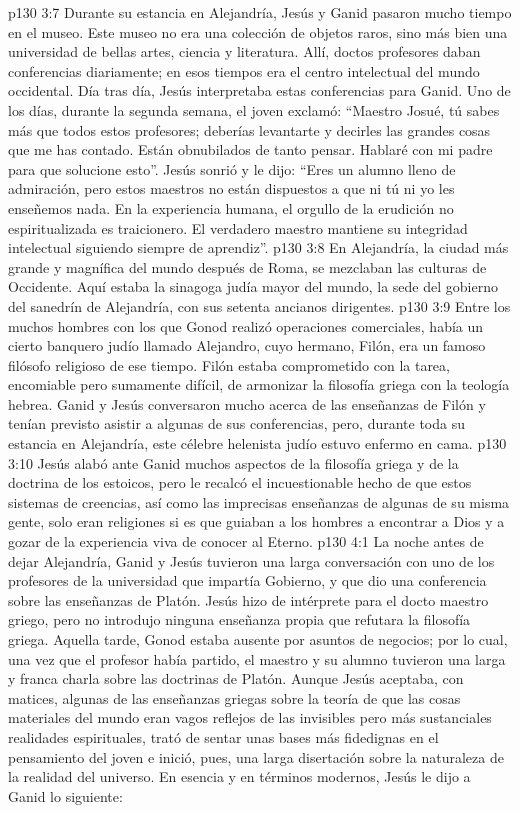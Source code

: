 \vs p130 3:7 \pc Durante su estancia en Alejandría, Jesús y Ganid pasaron mucho tiempo en el museo. Este museo no era una colección de objetos raros, sino más bien una universidad de bellas artes, ciencia y literatura. Allí, doctos profesores daban conferencias diariamente; en esos tiempos era el centro intelectual del mundo occidental. Día tras día, Jesús interpretaba estas conferencias para Ganid. Uno de los días, durante la segunda semana, el joven exclamó: “Maestro Josué, tú sabes más que todos estos profesores; deberías levantarte y decirles las grandes cosas que me has contado. Están obnubilados de tanto pensar. Hablaré con mi padre para que solucione esto”. Jesús sonrió y le dijo: “Eres un alumno lleno de admiración, pero estos maestros no están dispuestos a que ni tú ni yo les enseñemos nada. En la experiencia humana, el orgullo de la erudición no espiritualizada es traicionero. El verdadero maestro mantiene su integridad intelectual siguiendo siempre de aprendiz”.
\vs p130 3:8 En Alejandría, la ciudad más grande y magnífica del mundo después de Roma, se mezclaban las culturas de Occidente. Aquí estaba la sinagoga judía mayor del mundo, la sede del gobierno del sanedrín de Alejandría, con sus setenta ancianos dirigentes.
\vs p130 3:9 Entre los muchos hombres con los que Gonod realizó operaciones comerciales, había un cierto banquero judío llamado Alejandro, cuyo hermano, Filón, era un famoso filósofo religioso de ese tiempo. Filón estaba comprometido con la tarea, encomiable pero sumamente difícil, de armonizar la filosofía griega con la teología hebrea. Ganid y Jesús conversaron mucho acerca de las enseñanzas de Filón y tenían previsto asistir a algunas de sus conferencias, pero, durante toda su estancia en Alejandría, este célebre helenista judío estuvo enfermo en cama.
\vs p130 3:10 Jesús alabó ante Ganid muchos aspectos de la filosofía griega y de la doctrina de los estoicos, pero le recalcó el incuestionable hecho de que estos sistemas de creencias, así como las imprecisas enseñanzas de algunas de su misma gente, solo eran religiones si es que guiaban a los hombres a encontrar a Dios y a gozar de la experiencia viva de conocer al Eterno.
\vs p130 4:1 La noche antes de dejar Alejandría, Ganid y Jesús tuvieron una larga conversación con uno de los profesores de la universidad que impartía Gobierno, y que dio una conferencia sobre las enseñanzas de Platón. Jesús hizo de intérprete para el docto maestro griego, pero no introdujo ninguna enseñanza propia que refutara la filosofía griega. Aquella tarde, Gonod estaba ausente por asuntos de negocios; por lo cual, una vez que el profesor había partido, el maestro y su alumno tuvieron una larga y franca charla sobre las doctrinas de Platón. Aunque Jesús aceptaba, con matices, algunas de las enseñanzas griegas sobre la teoría de que las cosas materiales del mundo eran vagos reflejos de las invisibles pero más sustanciales realidades espirituales, trató de sentar unas bases más fidedignas en el pensamiento del joven e inició, pues, una larga disertación sobre la naturaleza de la realidad del universo. En esencia y en términos modernos, Jesús le dijo a Ganid lo siguiente:

